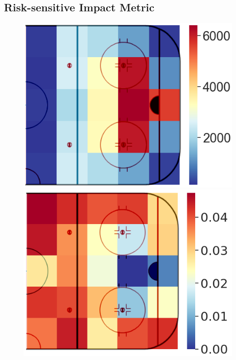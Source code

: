 \documentclass{article}
\begin{document}
\subsection{Risk-sensitive Impact Metric}\label{subsec:evaluation-metric}
\begin{figure}
    \vspace{-0.2in}
    \includegraphics[scale=0.19]{figures/spatial_train_num_blend_crop.png}
    \includegraphics[scale=0.19]{figures/spatial_std_diff_blend_crop.png}

\end{figure}
\end{document}
